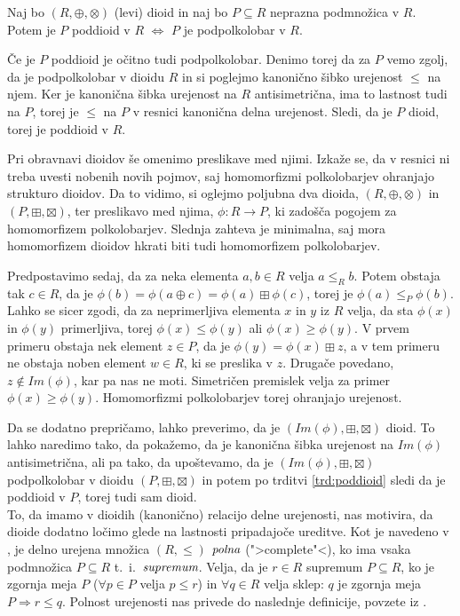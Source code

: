 \documentclass[mat1]{fmfdelo}
\newcommand{\pojem}[1]{\ensuremath{\emph{#1}}}
\newcommand{\map}[3]{\ensuremath{{#1}:{#2}\rightarrow{#3}}}
\begin{document}
\begin{trditev}
	\label{trd:poddioid}
	Naj bo $(R, \oplus, \otimes)$ (levi) dioid in naj bo $P\subseteq R$ neprazna podmnožica v $R$. Potem je $P$ poddioid v $R$ $\iff$ $P$ je podpolkolobar v $R$.
\end{trditev}

\begin{dokaz}
	Če je $P$ poddioid je očitno tudi podpolkolobar. Denimo torej da za $P$ vemo zgolj, da je podpolkolobar v dioidu $R$ in si poglejmo kanonično šibko urejenost $\leq$ na njem. Ker je kanonična šibka urejenost na $R$ antisimetrična, ima to lastnost tudi na $P$, torej je $\leq$ na $P$ v resnici kanonična delna urejenost. Sledi, da je $P$ dioid, torej je poddioid v $R$.
\end{dokaz}

Pri obravnavi dioidov še omenimo preslikave med njimi. Izkaže se, da v resnici ni treba uvesti nobenih novih pojmov, saj homomorfizmi polkolobarjev ohranjajo strukturo dioidov. Da to vidimo, si oglejmo poljubna dva dioida, $(R, \oplus, \otimes)$ in $(P, \boxplus, \boxtimes)$, ter preslikavo med njima, $\map{\phi}{R}{P}$, ki zadošča pogojem za homomorfizem polkolobarjev. Slednja zahteva je minimalna, saj mora homomorfizem dioidov hkrati biti tudi homomorfizem polkolobarjev. 

Predpostavimo sedaj, da za neka elementa $a, b\in R$ velja $a\leq_R b$. Potem obstaja tak $c\in R$, da je $\phi(b) = \phi(a\oplus c) = \phi(a) \boxplus\phi(c)$, torej je $\phi(a) \leq_P\phi(b)$. Lahko se sicer zgodi, da za neprimerljiva elementa $x$ in $y$ iz $R$ velja, da sta $\phi(x)$ in $\phi(y)$ primerljiva, torej $\phi(x) \leq \phi(y)$ ali $\phi(x) \geq \phi(y)$. V prvem primeru obstaja nek element $z\in P$, da je $\phi(y) = \phi(x) \boxplus z$, a v tem primeru ne obstaja noben element $w\in R$, ki se preslika v $z$. Drugače povedano, $z\notin Im(\phi)$, kar pa nas ne moti. Simetričen premislek velja za primer $\phi(x) \geq \phi(y)$. Homomorfizmi polkolobarjev torej ohranjajo urejenost.

Da se dodatno prepričamo, lahko preverimo, da je $(Im(\phi), \boxplus, \boxtimes)$ dioid. To lahko naredimo tako, da pokažemo, da je kanonična šibka urejenost na $Im(\phi)$ antisimetrična, ali pa tako, da upoštevamo, da je $(Im(\phi), \boxplus, \boxtimes)$ podpolkolobar v dioidu $(P, \boxplus, \boxtimes)$ in potem po trditvi \ref{trd:poddioid} sledi da je poddioid v $P$, torej tudi sam dioid.
\newline \\
To, da imamo v dioidih (kanonično) relacijo delne urejenosti, nas motivira, da dioide dodatno ločimo glede na lastnosti pripadajoče ureditve. Kot je navedeno v \cite[str. 10]{bib:Gondran}, je delno urejena množica $(R, \leq)$ \pojem{polna }(">complete"<), ko ima vsaka podmnožica $P \subseteq R$ t.~i.~\pojem{supremum}. 
Velja, da je $r\in R$ supremum $P\subseteq R$, ko je zgornja meja $P$ ($\forall p \in P$ velja $ p \leq r$) in $\forall q \in R$ velja sklep: $q$ je zgornja meja $P \Rightarrow r \leq q$. Polnost urejenosti nas privede do naslednje definicije, povzete iz \cite[definicija 6.\,1.\,8.\,]{bib:Gondran}.
\end{document}
